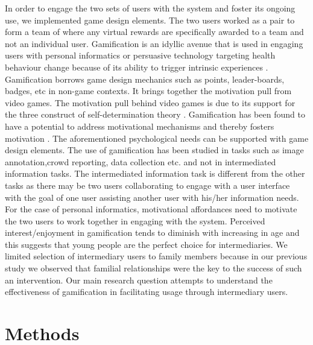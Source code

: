 \documentclass{sig-alternate}
\begin{document}
In order to engage the two sets of users with the system and foster its ongoing use, we implemented game design elements. The two users worked as a pair to form a team of where any virtual rewards are specifically awarded to a team and not an individual user. Gamification is an idyllic avenue that is used in engaging users with personal informatics or persuasive technology targeting health behaviour change because of its ability to trigger intrinsic experiences \cite{hamari2014persuasive}. Gamification borrows game design mechanics such as points, leader-boards, badges, etc in non-game contexts. It brings together the motivation pull from video games. The motivation pull behind video games is due to its support for the three construct of self-determination theory \cite{ryan2006:motivationalpull}. Gamification has been found to have a potential to address motivational mechanisms and thereby fosters motivation \cite{sailer2013:psychological}. The aforementioned psychological needs can be supported with game design elements.\newline
The use of gamification has been studied in tasks such as image annotation\cite{mekler2013:points,mekler2013:disassembling},crowd reporting\cite{crowley2012:gamification}, data collection \cite{cechanowicz2013:effects} etc. and not in intermediated information tasks. The intermediated information task is different from the other tasks as there may be two users collaborating to engage with a user interface with the goal of one user assisting another user with his/her information needs. For the case of personal informatics, motivational affordances need to motivate the two users to work together in engaging with the system. Perceived interest/enjoyment in gamification tends to diminish with increasing in age \cite{v2014motivational} and this suggests that young people are the perfect choice for intermediaries. We limited selection of intermediary users to family members because in our previous study we observed that familial relationships were the key to the success of such an intervention.\newline 
Our main research question attempts to understand the effectiveness of gamification in facilitating usage through intermediary users.
\section{Methods}
\end{document}

